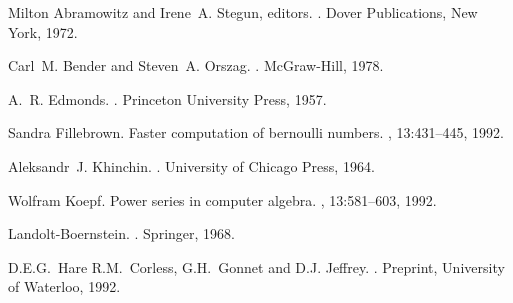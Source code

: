 \begin{thebibliography}{1}

Milton Abramowitz and Irene~A. Stegun, editors.
.
\newblock Dover Publications, New York, 1972.

Carl~M. Bender and Steven~A. Orszag.
.
\newblock McGraw-Hill, 1978.

A.~R. Edmonds.
.
\newblock Princeton University Press, 1957.

Sandra Fillebrown.
\newblock Faster computation of bernoulli numbers.
, 13:431--445, 1992.

Aleksandr~J. Khinchin.
.
\newblock University of Chicago Press, 1964.

Wolfram Koepf.
\newblock Power series in computer algebra.
, 13:581--603, 1992.

Landolt-Boernstein.
.
\newblock Springer, 1968.

D.E.G.~Hare R.M.~Corless, G.H.~Gonnet and D.J. Jeffrey.
.
\newblock Preprint, University of Waterloo, 1992.

\end{thebibliography}



